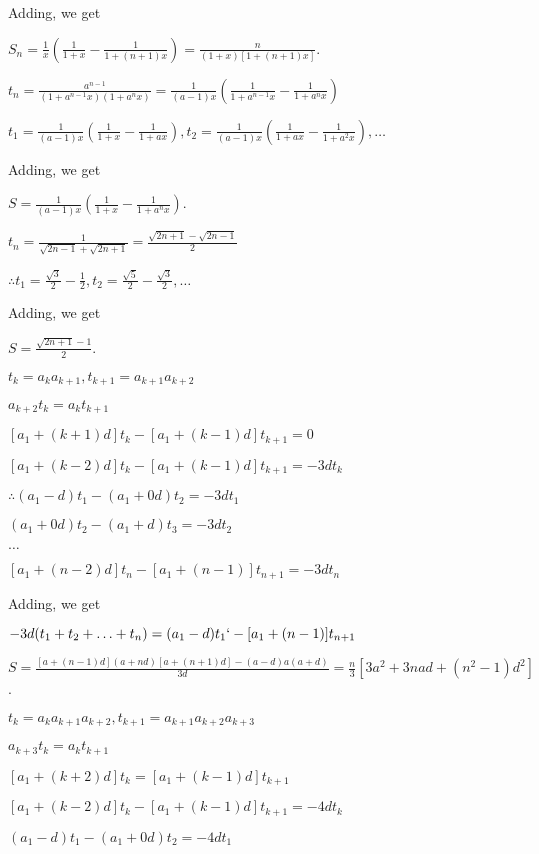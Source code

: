   Adding, we get

  $S_n = \frac{1}{x}\left(\frac{1}{1 + x} - \frac{1}{1 + (n + 1)x}\right) = \frac{n}{(1 + x)[1 + (n +
      1)x]}$.
\item $t_n = \frac{a^{n - 1}}{(1 + a^{n - 1}x)(1 + a^nx)} = \frac{1}{(a - 1)x}\left(\frac{1}{1 + a^{n - 1}x} -
  \frac{1}{1 + a^nx}\right)$

  $t_1 = \frac{1}{(a - 1)x}\left(\frac{1}{1 + x} - \frac{1}{1 + ax}\right), t_2 = \frac{1}{(a -
    1)x}\left(\frac{1}{1 + ax} - \frac{1}{1 + a^2x}\right), \ldots$

  Adding, we get

  $S = \frac{1}{(a - 1)x}\left(\frac{1}{1 + x} - \frac{1}{1 + a^n x}\right)$.
\item $t_n = \frac{1}{\sqrt{2n - 1} + \sqrt{2n + 1}} = \frac{\sqrt{2n + 1} - \sqrt{2n - 1}}{2}$

  $\therefore t_1 = \frac{\sqrt{3}}{2} - \frac{1}{2}, t_2 = \frac{\sqrt{5}}{2} - \frac{\sqrt{3}}{2}, \ldots$

  Adding, we get

  $S = \frac{\sqrt{2n + 1} - 1}{2}$.
\item $t_k = a_ka_{k + 1}, t_{k + 1} = a_{k +1}a_{k + 2}$

  $a_{k + 2}t_k = a_kt_{k + 1}$

  $[a_1 + (k + 1)d]t_k - [a_1 + (k - 1)d]t_{k + 1} = 0$

  $[a_1 + (k - 2)d]t_k - [a_1 + (k - 1)d]t_{k + 1} = -3dt_k$

  $\therefore (a_1 - d)t_1 - (a_1 + 0d)t_2 = -3dt_1$

  $(a_1 + 0d)t_2 - (a_1 + d)t_3 = -3dt_2$

  $\ldots$

  $[a_1 + (n - 2)d]t_n - [a_1+(n - 1)]t_{n + 1} = -3dt_n$

  Adding, we get

  $-3d(t_1 + t_2 + \ldots + t_n) = (a_1 -d)t_1` - [a_1+(n - 1)]t_{n + 1}$

  $S = \frac{[a + (n - 1)d](a + nd)[a + (n + 1)d] - (a - d)a(a + d)}{3d}= \frac{n}{3}[3a^2 + 3nad + (n^2 -
    1)d^2]$.
\item $t_k = a_ka_{k+1}a_{k+2}, t_{k+1}=a_{k+1}a_{k+2}a_{k+3}$

  $a_{k+3}t_k = a_kt_{k+1}$

  $[a_1 + (k + 2)d]t_k = [a_1 + (k - 1)d]t_{k + 1}$

  $[a_1 + (k - 2)d]t_k - [a_1 + (k - 1)d]t_{k+1} = -4dt_k$

  $(a_1 - d)t_1 - (a_1 + 0d)t_2 = -4dt_1$

